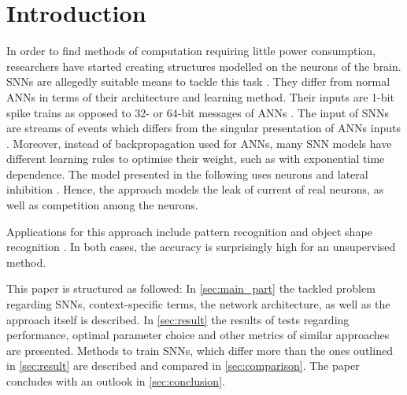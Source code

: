 \section{Introduction}

In order to find methods of computation requiring little power consumption, 
researchers have started creating structures modelled on the neurons of the brain.
\acp{SNN} are allegedly suitable means to tackle this task \cite{SNN}.
They differ from normal \acp{ANN} in terms of their architecture and learning method.
Their inputs are 1-bit spike trains as opposed to 32- or 64-bit messages of \acp{ANN} \cite{SNN}.
The input of \acp{SNN} are streams of events which differs from the singular presentation of \acp{ANN} inputs \cite{ANN_SNN_conversion}.
Moreover, instead of backpropagation used for \acp{ANN}, many \ac{SNN} models have different learning rules to optimise their weight, 
such as  with exponential time dependence.
The model presented in the following uses  neurons and lateral inhibition \cite{SNN}.
Hence, the approach models the leak of current of real neurons, as well as competition among the neurons.

Applications for this approach include pattern recognition \cite{SNN} and object shape recognition \cite{object_detection_SNN,multi_scale_STDP}.
In both cases, the accuracy is surprisingly high for an unsupervised method.

This paper is structured as followed:
In \autoref{sec:main_part} the tackled problem regarding \acp{SNN}, context-specific terms, the network architecture,
 as well as the approach itself is described.
In \autoref{sec:result} the results of tests regarding performance, optimal parameter choice and other metrics of similar approaches are presented.
Methods to train \acp{SNN}, which differ more than the ones outlined in \autoref{sec:result} are described and compared in \autoref{sec:comparison}.
The paper concludes with an outlook in \autoref{sec:conclusion}.